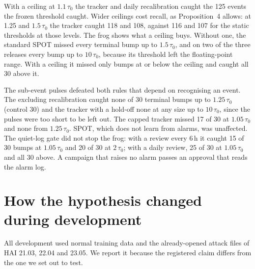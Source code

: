 \documentclass[sigconf]{acmart}
\begin{document}
With a ceiling at $1.1\,\tau_0$ the tracker and daily recalibration caught the 125 events the frozen
threshold caught. Wider ceilings cost recall, as Proposition~4 allows: at 1.25 and $1.5\,\tau_0$ the
tracker caught 118 and 108, against 116 and 107 for the static thresholds at those levels. The frog
shows what a ceiling buys. Without one, the standard SPOT missed every terminal bump up to
$1.5\,\tau_0$, and on two of the three releases every bump up to $10\,\tau_0$, because its threshold
left the floating-point range. With a ceiling it missed only bumps at or below the ceiling and caught
all 30 above it.

The sub-event pulses defeated both rules that depend on recognising an event. The excluding
recalibration caught none of 30 terminal bumps up to $1.25\,\tau_0$ (control 30) and the tracker with
a hold-off none at any size up to $10\,\tau_0$, since the pulses were too short to be left out. The capped
tracker missed 17 of 30 at $1.05\,\tau_0$ and none from $1.25\,\tau_0$. SPOT, which does not learn
from alarms, was unaffected. The quiet-log gate did not stop the frog: with a review every 6\,h it
caught 15 of 30 bumps at $1.05\,\tau_0$ and 20 of 30 at $2\,\tau_0$; with a daily review, 25 of 30
at $1.05\,\tau_0$ and all 30 above. A campaign that raises no alarm passes an approval that reads
the alarm log.

\FloatBarrier
\section{How the hypothesis changed during development}
\label{sec:development}

All development used normal training data and the already-opened attack files of HAI 21.03, 22.04
and 23.05. We report it because the registered claim differs from the one we set out to test.
\end{document}
